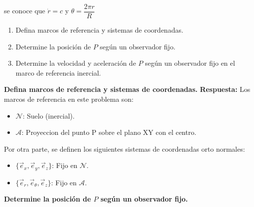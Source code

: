  se conoce que $\dot{r}=c$ y $\theta= \dfrac{2\pi r}{R}$
\begin{enumerate}
    \item Defina marcos de referencia y sistemas de coordenadas.
    \item Determine la posición de $P$ según un observador fijo. 
    \item Determine la  velocidad y aceleración de $P$ según un observador fijo en el marco de referencia inercial. 
\end{enumerate}


\ifmostrarSolucion
\begin{tcolorbox}[title=Arbol de Navidad,breakable]
\textbf{Defina marcos de referencia y sistemas de coordenadas.}
 \textbf{Respuesta:} Los marcos de referencia en este problema son:
    \begin{itemize}
        \item $\mathcal{N}$: Suelo (inercial).
        \item $\mathcal{A}$: Proyeccion del punto P sobre el plano XY con el centro.
    \end{itemize}
                Por otra parte, se definen los siguientes sistemas de coordenadas orto normales:
            \begin{itemize}
                \item $\{ \vec{e}_x, \vec{e}_y, \vec{e}_z \}$: Fijo en $\mathcal{N}$.
                \item $\{ \vec{e}_r, \vec{e}_{\theta}, \vec{e}_z \}$: Fijo en $\mathcal{A}$.
            \end{itemize}

\textbf{Determine la posición de $P$ según un observador fijo. }
\begin{center}
\end{center}
\end{tcolorbox}
